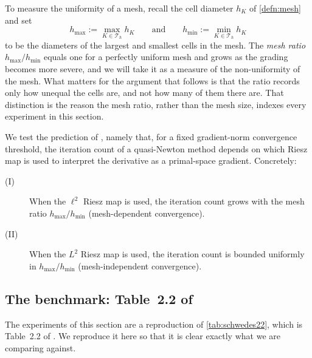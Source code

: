 \documentclass[a4paper,11pt]{article}
\theoremstyle{spacedplain} \newtheorem{theorem}[counter]{Theorem} \newtheorem{lemma}[counter]{Lemma} \newtheorem{prop}[counter]{Proposition} \newtheorem{cor}[counter]{Corollary}
\theoremstyle{spaceddefinition} \newtheorem{defn}[counter]{Definition} \newtheorem{example}[counter]{Example} \newtheorem{remark}[counter]{Remark}
\begin{document}
To measure the uniformity of a mesh, recall the cell diameter $h_K$ of \cref{defn:mesh} and set
\begin{equation}
  \label{eq:meshdep:hmax-hmin}
  h_{\max} := \max_{K \in \mathcal{T}_h} h_K
  \qquad \text{and} \qquad
  h_{\min} := \min_{K \in \mathcal{T}_h} h_K
\end{equation}
to be the diameters of the largest and smallest cells in the mesh. The \emph{mesh ratio} $h_{\max} / h_{\min}$ equals one for a perfectly uniform mesh and grows as the grading becomes more severe, and we will take it as a measure of the non-uniformity of the mesh. What matters for the argument that follows is that the ratio records only how unequal the cells are, and not how many of them there are. That distinction is the reason the mesh ratio, rather than the mesh size, indexes every experiment in this section. 

We test the prediction of \citet[Sect.~2.2]{shfp2017}, namely that, for a fixed gradient-norm convergence threshold, the iteration count of a quasi-Newton method depends on which Riesz map is used to interpret the derivative as a primal-space gradient. Concretely:

\begin{description}
  \item[(I)] When the $\ell^{2}$ Riesz map is used, the iteration count grows with the mesh ratio $h_{\max} / h_{\min}$ (mesh-dependent convergence).
  \item[(II)] When the $L^{2}$ Riesz map is used, the iteration count is bounded uniformly in $h_{\max} / h_{\min}$ (mesh-independent convergence).
\end{description}

\subsection{The benchmark: Table~2.2 of \texorpdfstring{\citet{shfp2017}}{Schwedes et al.}}
\label{sec:meshdep:benchmark}

The experiments of this section are a reproduction of \cref{tab:schwedes22}, which is Table~2.2 of \citet{shfp2017}. We reproduce it here so that it is clear exactly what we are comparing against.
\end{document}
